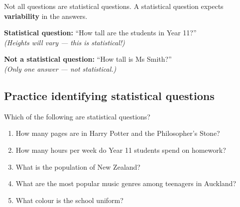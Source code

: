 \documentclass[
  11pt,
  a4paper,
  oneside,
  open=any]{scrbook}
\providecommand{\tightlist}{%
  \setlength{\itemsep}{0pt}\setlength{\parskip}{0pt}}
\begin{document}
Not all questions are statistical questions. A statistical question
expects \textbf{variability} in the answers.

\begin{tcolorbox}[enhanced jigsaw, breakable, leftrule=.75mm, bottomtitle=1mm, bottomrule=.15mm, titlerule=0mm, left=2mm, opacitybacktitle=0.6, coltitle=black, colbacktitle=quarto-callout-tip-color!10!white, rightrule=.15mm, title=\textcolor{quarto-callout-tip-color}{\faLightbulb}\hspace{0.5em}{Tip}, toptitle=1mm, arc=.35mm, colback=white, toprule=.15mm, colframe=quarto-callout-tip-color-frame, opacityback=0]

\textbf{Statistical question:} ``How tall are the students in Year
11?''\\
\emph{(Heights will vary --- this is statistical!)}

\textbf{Not a statistical question:} ``How tall is Ms Smith?''\\
\emph{(Only one answer --- not statistical.)}

\end{tcolorbox}

\subsection{Practice identifying statistical
questions}\label{practice-identifying-statistical-questions}

Which of the following are statistical questions?

\begin{enumerate}
\def\labelenumi{\arabic{enumi}.}
\tightlist
\item
  How many pages are in Harry Potter and the Philosopher's Stone?
\item
  How many hours per week do Year 11 students spend on homework?
\item
  What is the population of New Zealand?
\item
  What are the most popular music genres among teenagers in Auckland?
\item
  What colour is the school uniform?
\end{enumerate}
\end{document}
